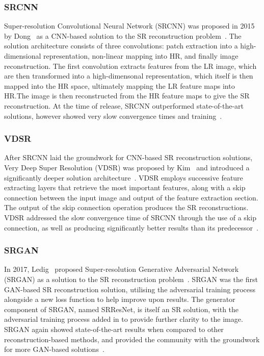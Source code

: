 \subsubsection{SRCNN}
Super-resolution Convolutional Neural Network (SRCNN) was proposed in 2015 by Dong \etal\ as a CNN-based solution to the SR reconstruction problem~\cite{srcnn}. The solution architecture consists of three convolutions: patch extraction into a high-dimensional representation, non-linear mapping into HR, and finally image reconstruction. The first convolution extracts features from the LR image, which are then transformed into a high-dimensonal representation, which itself is then mapped into the HR space, ultimately mapping the LR feature maps into HR.\@ The image is then reconstructed from the HR feature maps to give the SR reconstruction. At the time of release, SRCNN outperformed state-of-the-art solutions, however showed very slow convergence times and training~\cite{srcnn, vdsr}.

\subsubsection{VDSR}
After SRCNN laid the groundwork for CNN-based SR reconstruction solutions, Very Deep Super Resolution (VDSR) was proposed by Kim \etal\ and introduced a significantly deeper solution architecture~\cite{vdsr}. VDSR employs successive feature extracting layers that retrieve the most important features, along with a skip connection between the input image and output of the feature extraction section. The output of the skip connection operation produces the SR reconstructions. VDSR addressed the slow convergence time of SRCNN through the use of a skip connection, as well as producing significantly better results than its predecessor~\cite{vdsr}.

\subsubsection{SRGAN}
In 2017, Ledig \etal\ proposed Super-resolution Generative Adversarial Network (SRGAN) as a solution to the SR reconstruction problem~\cite{srgan}. SRGAN was the first GAN-based SR reconstruction solution, utilising the adversarial training process alongside a new loss function to help improve upon results. The generator component of SRGAN, named SRResNet, is itself an SR solution, with the adversarial training process added in to provide further clarity to the image. SRGAN again showed state-of-the-art results when compared to other reconstruction-based methods, and provided the community with the groundwork for more GAN-based solutions~\cite{srgan}.

